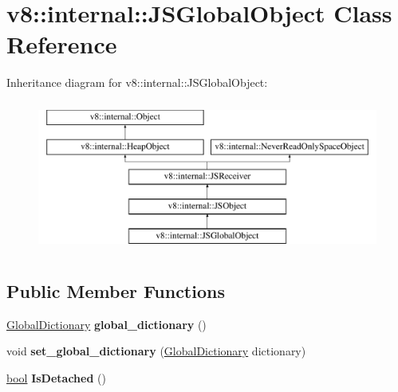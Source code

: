 \hypertarget{classv8_1_1internal_1_1JSGlobalObject}{}\section{v8\+:\+:internal\+:\+:J\+S\+Global\+Object Class Reference}
\label{classv8_1_1internal_1_1JSGlobalObject}
Inheritance diagram for v8\+:\+:internal\+:\+:J\+S\+Global\+Object\+:\begin{figure}[H]
\begin{center}
\leavevmode
\includegraphics[height=5.000000cm]{classv8_1_1internal_1_1JSGlobalObject}
\end{center}
\end{figure}
\subsection*{Public Member Functions}
\begin{DoxyCompactItemize}
\item 
\mbox{\label{classv8_1_1internal_1_1JSGlobalObject_ab192eb8283fae997a4990985974464ba}} 
\mbox{\hyperlink{classv8_1_1internal_1_1GlobalDictionary}{Global\+Dictionary}} {\bfseries global\+\_\+dictionary} ()
\item 
\mbox{\label{classv8_1_1internal_1_1JSGlobalObject_a65733c64de114e8bb86588041253ce2d}} 
void {\bfseries set\+\_\+global\+\_\+dictionary} (\mbox{\hyperlink{classv8_1_1internal_1_1GlobalDictionary}{Global\+Dictionary}} dictionary)
\item 
\mbox{\label{classv8_1_1internal_1_1JSGlobalObject_a9c78fdab942887837ce802a9f466c10f}} 
\mbox{\hyperlink{classbool}{bool}} {\bfseries Is\+Detached} ()
\end{DoxyCompactItemize}
